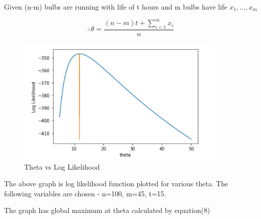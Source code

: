 \documentclass{article}
\begin{document}
Given (n-m) bulbs are running with life of t hours and m bulbs have life $x_1,...,x_m$

\begin{equation}
    \therefore \theta = \frac{(n-m)t + \sum_{i=1}^{m} x_i}{n}
\end{equation}

\begin{figure}[h]
    \centering
    \includegraphics[width=10cm]{fig1.png}
    \caption{Theta vs Log Likelihood}
\end{figure}

The above graph is log likelihood function plotted for various theta. The following variables are chosen - n=100, m=45, t=15.

The graph has global maximum at theta calculated by equation(8)  
\end{document}
